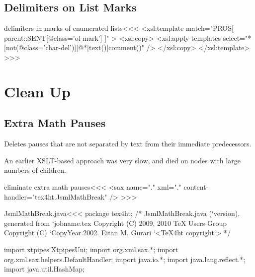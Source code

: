 \documentclass{article}
\begin{document}
\subsection{Delimiters on List Marks}



\<delimiters in marks of enumerated lists\><<<
<xsl:template match="PROS[  parent::SENT[@class='ol-mark'] ]" >
   <xsl:copy>
      <xsl:apply-templates 
           select="*[not(@class='char-del')]|@*|text()|comment()" />  
   </xsl:copy>
</xsl:template> 
>>>


\section{Clean Up}


\subsection{Extra Math Pauses}


Deletes pauses that are not separated by text from their immediate
predecessors. 

An earlier XSLT-based approach was very slow, and died
on nodes with large numbers of children.


\<eliminate extra math pauses\><<<
<sax name="." xml="." content-handler="tex4ht.JsmlMathBreak" />
>>>


 
\<JsmlMathBreak.java\><<< 
package tex4ht;
/* JsmlMathBreak.java (`version), generated from `jobname.tex
   Copyright (C) 2009, 2010 TeX Users Group
   Copyright (C) `CopyYear.2002. Eitan M. Gurari
`<TeX4ht copyright`> */

import xtpipes.XtpipesUni;
import org.xml.sax.*;
import org.xml.sax.helpers.DefaultHandler;
import java.io.*;
import java.lang.reflect.*;
import java.util.HashMap;
\end{document}

